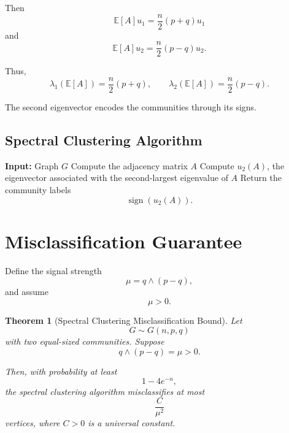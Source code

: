 \documentclass[12pt,oneside]{book}
\numberwithin{equation}{section}
\theoremstyle{definition}
\theoremstyle{plain}
\newtheorem{theorem}{Theorem}[section]
\theoremstyle{remark}
\newcommand{\E}{\mathbb{E}}
\begin{document}
Then
\[
\E[A]u_1
=
\frac{n}{2}(p+q)u_1
\]
and
\[
\E[A]u_2
=
\frac{n}{2}(p-q)u_2.
\]

Thus,
\[
\lambda_1(\E[A])
=
\frac{n}{2}(p+q),
\qquad
\lambda_2(\E[A])
=
\frac{n}{2}(p-q).
\]

The second eigenvector encodes the communities through its signs.

\subsection{Spectral Clustering Algorithm}

\begin{algorithm}[H]
\caption{Spectral Clustering for the Two-Community SBM}
\begin{algorithmic}[1]
\State \textbf{Input:} Graph $G$
\State Compute the adjacency matrix $A$
\State Compute $u_2(A)$, the eigenvector associated with the second-largest eigenvalue of $A$
\State Return the community labels
\[
\operatorname{sign}(u_2(A)).
\]
\end{algorithmic}
\end{algorithm}

\section{Misclassification Guarantee}

Define the signal strength
\[
\mu
=
q\wedge (p-q),
\]
and assume
\[
\mu>0.
\]

\begin{theorem}[Spectral Clustering Misclassification Bound]
Let
\[
G\sim G(n,p,q)
\]
with two equal-sized communities. Suppose
\[
q\wedge(p-q)=\mu>0.
\]

Then, with probability at least
\[
1-4e^{-n},
\]
the spectral clustering algorithm misclassifies at most
\[
\frac{C}{\mu^2}
\]
vertices, where $C>0$ is a universal constant.
\end{theorem}
\end{document}
